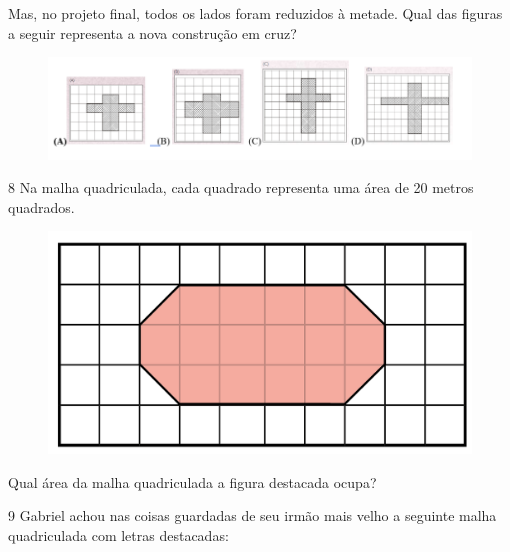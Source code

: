 Mas, no projeto final, todos os lados foram reduzidos à metade. Qual das
figuras a seguir representa a nova construção em cruz?

\begin{figure}[htpb!]
\includegraphics[width=\textwidth]{./imgs/mat6.png}
\end{figure}


\pagebreak
\num{8} Na malha quadriculada, cada quadrado representa uma área de
20 metros quadrados.

\begin{figure}[htpb!]
\centering
\includegraphics[width=\textwidth]{../ilustracoes/MAT5/SAEB_5ANO_MAT_figura43.png}
\end{figure}

Qual área da malha quadriculada a figura destacada ocupa?


\pagebreak

\num{9} Gabriel achou nas coisas guardadas de seu irmão mais velho a
seguinte malha quadriculada com letras destacadas:

